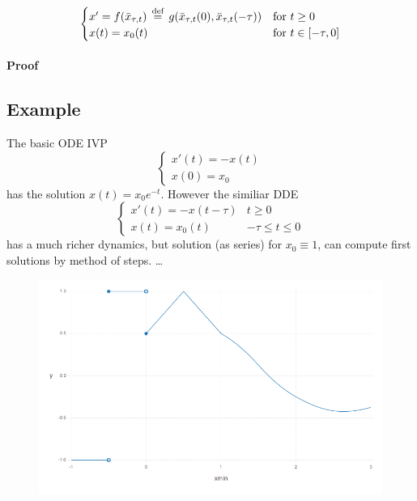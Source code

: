 \documentclass[10pt]{article}
\begin{document}

\begin{equation}
    \begin{cases}
        x'=f(\bar{x}_{\tau,t})\,\stackrel{\text{def}}{=}\, g(\bar{x}_{\tau,t}(0),\bar{x}_{\tau,t}(-\tau)) &\text{for } t\geq 0\\
        x(t)=x_0(t) & \text{for } t\in[-\tau,0]
    \end{cases}
\end{equation}

\paragraph{Proof}\label{proof-2}

\subsection{Example}\label{example}
The basic ODE IVP
\begin{equation}
    \begin{cases}
        x'(t) = -x(t)\\
        x(0) = x_0
    \end{cases}
\end{equation}
has the solution $x(t)=x_0 e^{-t}$. However the similiar DDE
\begin{equation}
    \begin{cases}
        x'(t) = -x(t-\tau) & t\geq 0\\
        x(t) = x_0(t) & -\tau\leq t\leq 0
    \end{cases}
\end{equation}
has a much richer dynamics, but solution (as series) for $x_0\equiv 1$, can compute first solutions by method of steps. \ldots{}

\begin{figure}[h]\centering
    \includegraphics[width=\textwidth]{piecewise-initial-function.png}
	\label{fig:not-allowed}
\end{figure}
\end{document}
